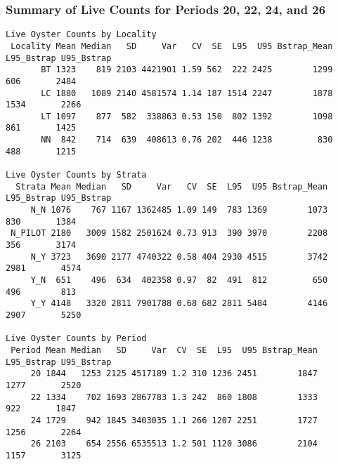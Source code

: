 \documentclass[
]{article}
\begin{document}
\hypertarget{summary-of-live-counts-for-periods-20-22-24-and-26}{%
\subsubsection{Summary of Live Counts for Periods 20, 22, 24, and
26}\label{summary-of-live-counts-for-periods-20-22-24-and-26}}

\begin{verbatim}
Live Oyster Counts by Locality
 Locality Mean Median   SD     Var   CV  SE  L95  U95 Bstrap_Mean L95_Bstrap U95_Bstrap
       BT 1323    819 2103 4421901 1.59 562  222 2425        1299        606       2484
       LC 1880   1089 2140 4581574 1.14 187 1514 2247        1878       1534       2266
       LT 1097    877  582  338863 0.53 150  802 1392        1098        861       1425
       NN  842    714  639  408613 0.76 202  446 1238         830        488       1215

Live Oyster Counts by Strata
  Strata Mean Median   SD     Var   CV  SE  L95  U95 Bstrap_Mean L95_Bstrap U95_Bstrap
     N_N 1076    767 1167 1362485 1.09 149  783 1369        1073        830       1384
 N_PILOT 2180   3009 1582 2501624 0.73 913  390 3970        2208        356       3174
     N_Y 3723   3690 2177 4740322 0.58 404 2930 4515        3742       2981       4574
     Y_N  651    496  634  402358 0.97  82  491  812         650        496        813
     Y_Y 4148   3320 2811 7901788 0.68 682 2811 5484        4146       2907       5250

Live Oyster Counts by Period
 Period Mean Median   SD     Var  CV  SE  L95  U95 Bstrap_Mean L95_Bstrap U95_Bstrap
     20 1844   1253 2125 4517189 1.2 310 1236 2451        1847       1277       2520
     22 1334    702 1693 2867783 1.3 242  860 1808        1333        922       1847
     24 1729    942 1845 3403035 1.1 266 1207 2251        1727       1256       2264
     26 2103    654 2556 6535513 1.2 501 1120 3086        2104       1157       3125
\end{verbatim}
\end{document}

